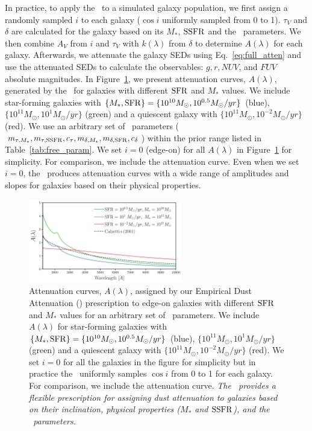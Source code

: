 In practice, to apply the \eda~to a simulated galaxy population, we first
assign a randomly sampled $i$ to each galaxy ($\cos i$ uniformly sampled from 0 to 1).
$\tau_V$ and $\delta$ are calculated for
the galaxy based on its $M_*$,
${\rm SSFR}$ and the \eda~parameters. We then combine $A_V$ from $i$ and
$\tau_V$ with $k(\lambda)$ from $\delta$ to determine $A(\lambda)$ for each
galaxy.
Afterwards, we attenuate the galaxy SEDs using Eq.~\ref{eq:full_atten} and use
the attenuated SEDs to calculate the observables: $g, r, NUV$, and $FUV$
absolute magnitudes. 
In Figure~\ref{fig:dem_av}, we present attenuation curves, $A(\lambda)$,
generated by the \eda~for galaxies with different ${\rm SFR}$ and $M_*$ values.  
We include star-forming galaxies with $\{M_*, {\rm SFR}\} = \{10^{10}M_\odot,
10^{0.5}M_\odot/yr\}$ (blue), $\{10^{11}M_\odot, 10^{1} M_\odot/yr\}$
(green) and a quiescent galaxy with $\{10^{11}M_\odot, 10^{-2}M_\odot/yr\}$
(red).
We use an arbitrary set of \eda~parameters ($m_{\tau,M_*}, m_{\tau,{\rm SSFR}}, c_\tau,
m_{\delta,M_*}, m_{\delta,{\rm SFR}}, c_\delta$) within the prior range listed in
Table~\ref{tab:free_param}. 
We set $i=0$ (edge-on) for all $A(\lambda)$ in Figure~\ref{fig:dem_av} for
simplicity.
For comparison, we include the \cite{calzetti2001} attenuation curve. Even when
we set $i=0$, the \eda~produces attenuation curves with a wide range
of amplitudes and slopes for galaxies based on their physical properties. 

\begin{figure}
\begin{center}
    \includegraphics[width=0.6\textwidth]{figs/dems.pdf}
    \caption{\label{fig:dem_av}
    Attenuation curves, $A(\lambda)$, assigned by our Empirical Dust
    Attenuation (\eda) prescription to edge-on galaxies with different ${\rm SFR}$ and
    $M_*$ values for an arbitrary set of \eda~parameters. We include
    $A(\lambda)$ for star-forming galaxies with $\{M_*, {\rm SFR}\} =
    \{10^{10}M_\odot, 10^{0.5}M_\odot/yr\}$ (blue), $\{10^{11}M_\odot, 10^{1}
    M_\odot/yr\}$ (green) and a quiescent galaxy with $\{10^{11}M_\odot,
    10^{-2}M_\odot/yr\}$ (red). We set $i=0$ for
    all the galaxies in the figure for simplicity but in practice the
    \eda~uniformly samples $\cos i$ from 0 to 1 for each galaxy.
    For comparison, we include the \cite{calzetti2001} attenuation curve.
    {\em The \eda~provides a flexible prescription for assigning dust
    attenuation to galaxies based on their inclination, physical properties
    ($M_*$ and ${\rm SSFR}$), and the \eda~parameters.}
    } 
\end{center}
\end{figure}


